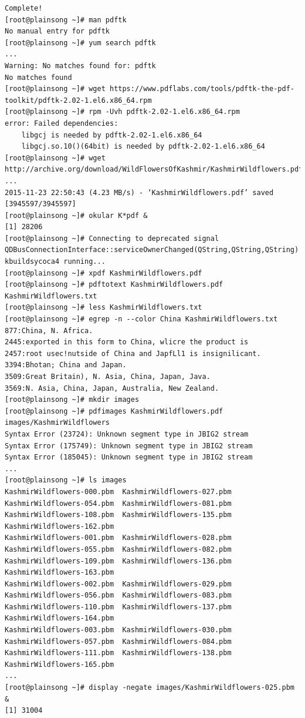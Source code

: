 \documentclass[10pt]{article}
\begin{document}
\begin{Verbatim}[fontsize=\scriptsize]
Complete!
[root@plainsong ~]# man pdftk
No manual entry for pdftk
[root@plainsong ~]# yum search pdftk
...
Warning: No matches found for: pdftk
No matches found
[root@plainsong ~]# wget https://www.pdflabs.com/tools/pdftk-the-pdf-toolkit/pdftk-2.02-1.el6.x86_64.rpm
[root@plainsong ~]# rpm -Uvh pdftk-2.02-1.el6.x86_64.rpm 
error: Failed dependencies:
	libgcj is needed by pdftk-2.02-1.el6.x86_64
	libgcj.so.10()(64bit) is needed by pdftk-2.02-1.el6.x86_64
[root@plainsong ~]# wget http://archive.org/download/WildFlowersOfKashmir/KashmirWildflowers.pdf
...
2015-11-23 22:50:43 (4.23 MB/s) - ‘KashmirWildflowers.pdf’ saved [3945597/3945597]
[root@plainsong ~]# okular K*pdf &
[1] 28206
[root@plainsong ~]# Connecting to deprecated signal QDBusConnectionInterface::serviceOwnerChanged(QString,QString,QString)
kbuildsycoca4 running...
[root@plainsong ~]# xpdf KashmirWildflowers.pdf 
[root@plainsong ~]# pdftotext KashmirWildflowers.pdf KashmirWildflowers.txt
[root@plainsong ~]# less KashmirWildflowers.txt
[root@plainsong ~]# egrep -n --color China KashmirWildflowers.txt
877:China, N. Africa.
2445:exported in this form to China, wlicre the product is
2457:root usec!nutside of China and JapfLl1 is insignilicant.
3394:Bhotan; China and Japan.
3509:Great Britain), N. Asia, China, Japan, Java.
3569:N. Asia, China, Japan, Australia, New Zealand.
[root@plainsong ~]# mkdir images
[root@plainsong ~]# pdfimages KashmirWildflowers.pdf images/KashmirWildflowers
Syntax Error (23724): Unknown segment type in JBIG2 stream
Syntax Error (175749): Unknown segment type in JBIG2 stream
Syntax Error (185045): Unknown segment type in JBIG2 stream
...
[root@plainsong ~]# ls images
KashmirWildflowers-000.pbm  KashmirWildflowers-027.pbm  KashmirWildflowers-054.pbm  KashmirWildflowers-081.pbm  KashmirWildflowers-108.pbm  KashmirWildflowers-135.pbm  KashmirWildflowers-162.pbm
KashmirWildflowers-001.pbm  KashmirWildflowers-028.pbm  KashmirWildflowers-055.pbm  KashmirWildflowers-082.pbm  KashmirWildflowers-109.pbm  KashmirWildflowers-136.pbm  KashmirWildflowers-163.pbm
KashmirWildflowers-002.pbm  KashmirWildflowers-029.pbm  KashmirWildflowers-056.pbm  KashmirWildflowers-083.pbm  KashmirWildflowers-110.pbm  KashmirWildflowers-137.pbm  KashmirWildflowers-164.pbm
KashmirWildflowers-003.pbm  KashmirWildflowers-030.pbm  KashmirWildflowers-057.pbm  KashmirWildflowers-084.pbm  KashmirWildflowers-111.pbm  KashmirWildflowers-138.pbm  KashmirWildflowers-165.pbm
...
[root@plainsong ~]# display -negate images/KashmirWildflowers-025.pbm &
[1] 31004
\end{Verbatim}
\end{document}
